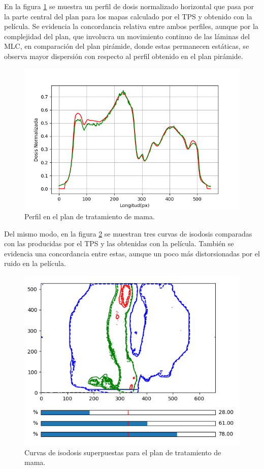 En la figura \ref{fig:mamaPerfil} se muestra un perfil de dosis normalizado horizontal que pasa por la parte central del plan para los mapas calculado por el TPS y obtenido con la película. Se evidencia la concordancia relativa entre ambos perfiles, aunque por la complejidad del plan, que involucra un movimiento continuo de las láminas del MLC, en comparación del plan pirámide, donde estas permanecen estáticas, se observa mayor dispersión con respecto al perfil obtenido en el plan pirámide.\\

\begin{figure}[H]
	\centering
	\includegraphics[width=0.7\linewidth]{images/perfilDosisMama.png}
	\caption{Perfil en el plan de tratamiento de mama. }
	\label{fig:mamaPerfil}
\end{figure}

Del mismo modo, en la figura \ref{fig:mamaIsodosis} se muestran tres curvas de isodosis comparadas con las producidas por el TPS y las obtenidas con la película. También se evidencia una concordancia entre estas, aunque un poco más distorsionadas por el ruido en la película.

\begin{figure}[H]
	\centering
	\includegraphics[width=0.7\linewidth]{images/curvasIsodosisMama.png}
	\caption{Curvas de isodosis superpuestas para el plan de tratamiento de mama. }
	\label{fig:mamaIsodosis}
\end{figure}

